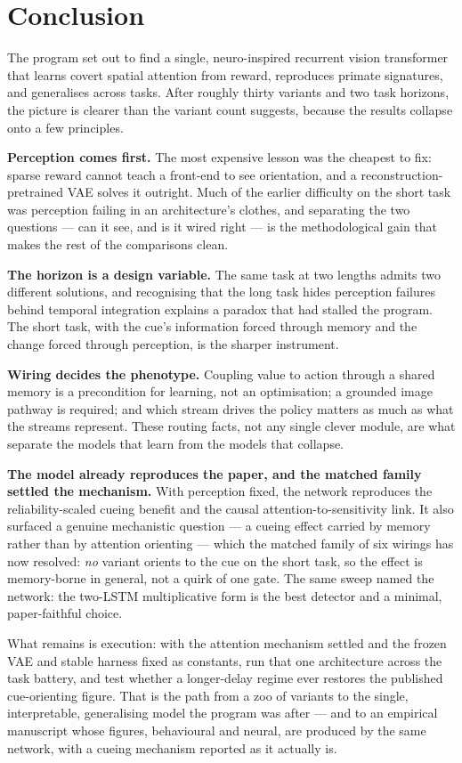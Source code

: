 \chapter{Conclusion}
\label{ch:conclusion}

The program set out to find a single, neuro-inspired recurrent vision transformer that
learns covert spatial attention from reward, reproduces primate signatures, and generalises
across tasks. After roughly thirty variants and two task horizons, the picture is clearer
than the variant count suggests, because the results collapse onto a few principles.

\textbf{Perception comes first.} The most expensive lesson was the cheapest to fix: sparse
reward cannot teach a front-end to see orientation, and a reconstruction-pretrained VAE
solves it outright. Much of the earlier difficulty on the short task was perception failing
in an architecture's clothes, and separating the two questions --- can it see, and is it
wired right --- is the methodological gain that makes the rest of the comparisons clean.

\textbf{The horizon is a design variable.} The same task at two lengths admits two different
solutions, and recognising that the long task hides perception failures behind temporal
integration explains a paradox that had stalled the program. The short task, with the cue's
information forced through memory and the change forced through perception, is the sharper
instrument.

\textbf{Wiring decides the phenotype.} Coupling value to action through a shared memory is a
precondition for learning, not an optimisation; a grounded image pathway is required; and
which stream drives the policy matters as much as what the streams represent. These routing
facts, not any single clever module, are what separate the models that learn from the models
that collapse.

\textbf{The model already reproduces the paper, and the matched family settled the
mechanism.} With perception fixed, the network reproduces the reliability-scaled cueing
benefit and the causal attention-to-sensitivity link. It also surfaced a genuine mechanistic
question --- a cueing effect carried by memory rather than by attention orienting --- which
the matched family of six wirings has now resolved: \emph{no} variant orients to the cue on
the short task, so the effect is memory-borne in general, not a quirk of one gate. The same
sweep named the network: the two-LSTM multiplicative form is the best detector and a
minimal, paper-faithful choice.

What remains is execution: with the attention mechanism settled and the frozen VAE and
stable harness fixed as constants, run that one architecture across the task battery, and
test whether a longer-delay regime ever restores the published cue-orienting figure. That is
the path from a zoo of variants to the single, interpretable, generalising model the program
was after --- and to an empirical manuscript whose figures, behavioural and neural, are
produced by the same network, with a cueing mechanism reported as it actually is.
